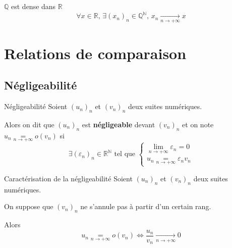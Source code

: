     \begin{coro}{$\mathbb{Q}$ est dense dans $\mathbb{R}$}{}
        \[ \forall x \in \mathbb{R} , \, \exists (x_n)_n \in \mathbb{Q}^{\mathbb{N}}, \, x_n \underset{n \rightarrow +\infty}{\longrightarrow} x \]
    \end{coro}

\section{Relations de comparaison}

\subsection{Négligeabilité}

    \begin{defi}{Négligeabilité}{}
	    Soient $(u_n)_n$ et $(v_n)_n$ deux suites numériques.

	    Alors on dit que $(u_n)_n$ est \textbf{négligeable} devant $(v_n)_n$ et on note $u_n \underset{n \rightarrow +\infty}{=} o(v_n)$ si
	    \[ \exists (\varepsilon_n)_n \in \mathbb{R}^{\mathbb{N}} \text{ tel que } \left\{ \begin{array}{ll}
	    \underset{n \rightarrow + \infty}{\lim} \varepsilon_n = 0 \\
	    u_n \underset{n \rightarrow +\infty}{=} \varepsilon_n v_n
	    \end{array} \right. \]
    \end{defi}

    \begin{theo}{Caractérisation de la négligeabilité}{}
	    Soient $(u_n)_n$ et $(v_n)_n$ deux suites numériques.

	    On suppose que $(v_n)_n$ ne s’annule pas à partir d’un certain rang.

	    Alors 
	    \[ u_n \underset{n \rightarrow +\infty}{=} o(v_n) \iff \frac{u_n}{v_n} \underset{n \rightarrow +\infty}{\longrightarrow} 0 \]
    \end{theo}

